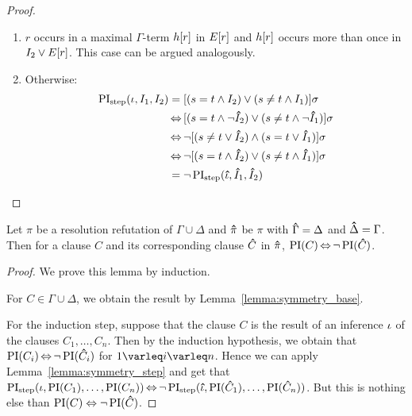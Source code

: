\begin{proof}
\begin{indproof}
\begin{enumerate}
						\item $r$ occurs in a maximal $\Gamma$-term $h[r]$ in $E[r]$ and $h[r]$ occurs more than once in $I_2 \lor E[r]$.
							This case can be argued analogously.
						\item Otherwise:
							\begin{align*}
								\operatorname{PI}_{\mathrm{step}}(\iota, I_1, I_2) &= [ ( s=t \land I_2 ) \lor (s\neq t \land I_1) ]\sigma \\
														&\operatorname{\Leftrightarrow}\, [ ( s=t \land \lnot \bm\hat{I}_2 ) \lor (s\neq t \land \lnot \bm\hat{I}_1) ]\sigma \\
														&\operatorname{\Leftrightarrow} \lnot [ ( s\neq t \lor \bm\hat{I}_2 ) \land (s=t \lor \bm\hat{I}_1) ]\sigma \\
														&\operatorname{\Leftrightarrow} \lnot [ ( s=t \land \bm\hat{I}_2 ) \lor (s\neq t \land \bm\hat{I}_1) ]\sigma \\
													 &= \lnot \operatorname{PI}_{\mathrm{step}}(\bm\hat{\iota}, \bm\hat{I}_1, \bm\hat{I}_2)
								\qedhere
							\end{align*}
					\end{enumerate}


	\end{indproof}

\end{proof}



\begin{lemma}
	\label{lemma:symmetry}
	Let $\pi$ be a resolution refutation of $\Gamma \cup \Delta$ and
	$\bm\hat{\pi}$ be $\pi$ with $\bm\hat{\Gamma} = \Delta$ and $\bm\hat{\Delta} = \Gamma$.
	Then for a clause $C$ and its corresponding clause $\bm\hat{C}$ in $\bm\hat{\pi}$, $\operatorname{PI}(C) \operatorname{\Leftrightarrow} \lnot \operatorname{PI}(\bm\hat{C})$.
\end{lemma}
\begin{proof}
	We prove this lemma by induction.

	For $C \in \Gamma \cup \Delta$, we obtain the result by Lemma~\ref{lemma:symmetry_base}.

	For the induction step, suppose that the clause $C$ is the result of an inference $\iota$ of the clauses $C_1, \dots, C_n$.
	Then by the induction hypothesis, we obtain that  $\operatorname{PI}(C_i) \operatorname{\Leftrightarrow} \lnot \operatorname{PI}(\bm\hat{C}_i)$ for $1 \varleq i \varleq n$. 
	Hence we can apply Lemma~\ref{lemma:symmetry_step} and get that  $\operatorname{PI}_{\mathrm{step}}(\iota, \operatorname{PI}(C_1), \dots, \operatorname{PI}(C_n)) \operatorname{\Leftrightarrow} \lnot \operatorname{PI}_{\mathrm{step}}(\bm\hat{\iota}, \operatorname{PI}(\bm\hat{C}_1), \dots, \operatorname{PI}(\bm\hat{C}_n))$.
	But this is nothing else than $\operatorname{PI}(C) \;{\operatorname{\Leftrightarrow}}\; \lnot \operatorname{PI}(\bm\hat{C})$.
\end{proof}


